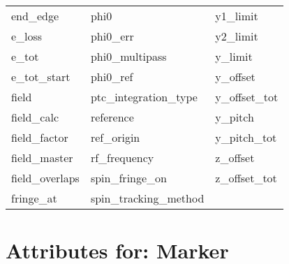 \begin{tabular}{lll}
end_edge                    & phi0                        & y1_limit                    \\
e_loss                      & phi0_err                    & y2_limit                    \\
e_tot                       & phi0_multipass              & y_limit                     \\
e_tot_start                 & phi0_ref                    & y_offset                    \\
field                       & ptc_integration_type        & y_offset_tot                \\
field_calc                  & reference                   & y_pitch                     \\
field_factor                & ref_origin                  & y_pitch_tot                 \\
field_master                & rf_frequency                & z_offset                    \\
field_overlaps              & spin_fringe_on              & z_offset_tot                \\
fringe_at                   & spin_tracking_method        &                             \\
 \bottomrule
 \end{tabular}
 \vfill
 
 \section{Attributes for: Marker}
 \label{s:list.marker}
 

